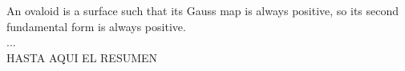 An ovaloid is a surface such that its Gauss map is always positive, so its second fundamental form is always positive.
${ }$\\

...
${ }$\\

HASTA AQUI EL RESUMEN
${ }$\\






















